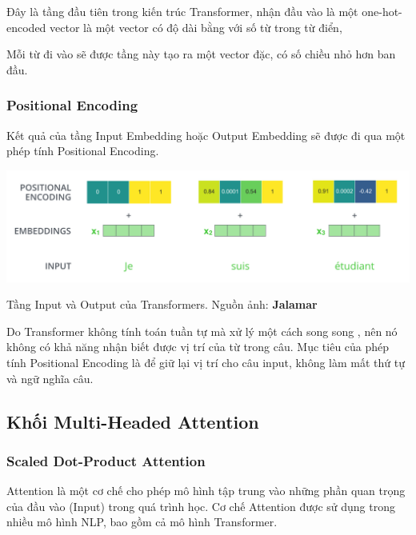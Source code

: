 \documentclass[a4paper, 10pt]{article}
\begin{document}
Đây là tầng đầu tiên trong kiến trúc Transformer, nhận đầu vào là một 
one-hot-encoded vector là một vector có độ dài bằng với số từ trong từ điển,

Mỗi từ đi vào sẽ được tầng này tạo ra một vector đặc, có số chiều nhỏ hơn ban đầu.
\subsubsection {Positional Encoding}
Kết quả của tầng Input Embedding hoặc Output Embedding 
sẽ được đi qua một phép tính Positional Encoding.

\begin{minipage}{\linewidth}
    \captionsetup{type=figure}
    \centering
    \includegraphics[width=14cm]{./transformer_input.png}
    \caption{Tầng Input và Output của Transformers. Nguồn ảnh: \textbf{Jalamar}}
\end{minipage}


Do Transformer không tính toán tuần tự mà xử lý một cách song song , nên nó không có khả năng 
nhận biết được vị trí của từ trong câu. Mục tiêu của phép tính
Positional Encoding là để giữ lại vị trí cho câu input, không làm mất thứ tự và ngữ nghĩa câu.

\subsection{Khối Multi-Headed Attention}
\subsubsection{Scaled Dot-Product Attention}
Attention là một cơ chế cho phép mô hình tập trung vào những phần quan trọng của đầu vào (Input) trong quá trình học. 
Cơ chế Attention được sử dụng trong nhiều mô hình NLP, bao gồm cả mô hình Transformer.
\end{document}
